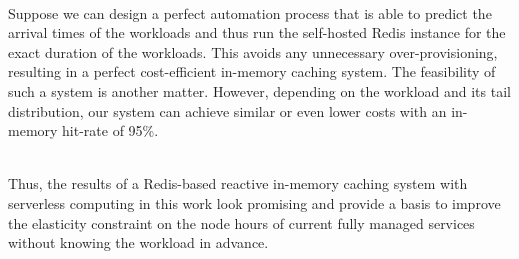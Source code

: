 ~\\
Suppose we can design a perfect automation process that is able to predict the arrival times of the workloads and thus run the self-hosted Redis instance for the exact duration of the workloads. This avoids any unnecessary over-provisioning, resulting in a perfect cost-efficient in-memory caching system. The feasibility of such a system is another matter. However, depending on the workload and its tail distribution, our system can achieve similar or even lower costs with an in-memory hit-rate of 95\%. 

~\\
Thus, the results of a Redis-based reactive in-memory caching system with serverless computing in this work look promising and provide a basis to improve the elasticity constraint on the node hours of current fully managed services without knowing the workload in advance.





